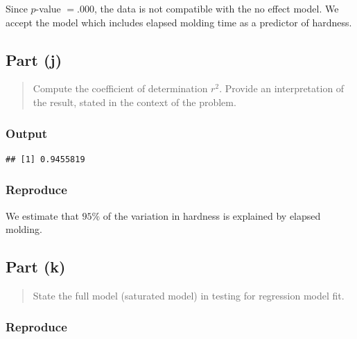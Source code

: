 \documentclass[
]{article}
\newenvironment{Shaded}{\begin{snugshade}}{\end{snugshade}}
\newcommand{\FunctionTok}[1]{\textcolor[rgb]{0.13,0.29,0.53}{\textbf{#1}}}
\newcommand{\NormalTok}[1]{#1}
\newcommand{\SpecialCharTok}[1]{\textcolor[rgb]{0.81,0.36,0.00}{\textbf{#1}}}
\begin{document}
Since \(p\)-value \(= .000\), the data is not compatible with the no
effect model. We accept the model which includes elapsed molding time as
a predictor of hardness.

\hypertarget{part-j}{%
\subsection{Part (j)}\label{part-j}}

\begin{quote}
Compute the coefficient of determination \(r^2\). Provide an
interpretation of the result, stated in the context of the problem.
\end{quote}

\hypertarget{output-4}{%
\subsubsection{Output}\label{output-4}}

\begin{Shaded}
\end{Shaded}

\begin{verbatim}
## [1] 0.9455819
\end{verbatim}

\hypertarget{reproduce-7}{%
\subsubsection{Reproduce}\label{reproduce-7}}

We estimate that \(95\%\) of the variation in hardness is explained by
elapsed molding.

\hypertarget{part-k}{%
\subsection{Part (k)}\label{part-k}}

\begin{quote}
State the full model (saturated model) in testing for regression model
fit.
\end{quote}

\hypertarget{reproduce-8}{%
\subsubsection{Reproduce}\label{reproduce-8}}
\end{document}
